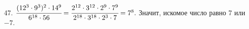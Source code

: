 47. $\cfrac{(12^3\cdot9^3)^2\cdot14^9}{6^{18}\cdot56}=\cfrac{2^{12}\cdot3^{12}\cdot2^9\cdot7^9}{2^{18}\cdot3^{18}\cdot2^3\cdot7}=7^8.$ Значит, искомое число равно 7 или $-7.$\\
